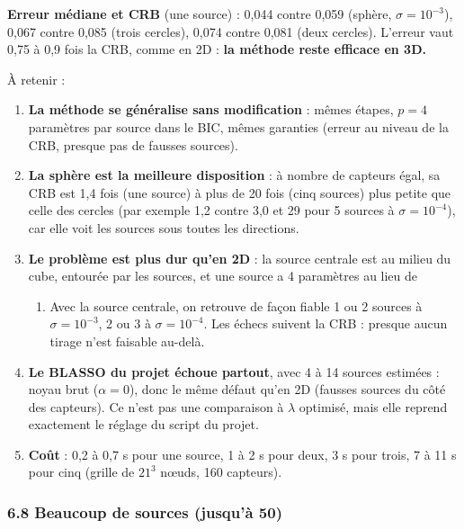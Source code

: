 \documentclass[
  french,
]{article}
\providecommand{\tightlist}{%
  \setlength{\itemsep}{0pt}\setlength{\parskip}{0pt}}
\begin{document}
\textbf{Erreur médiane et CRB} (une source) : 0,044 contre 0,059
(sphère, \(\sigma = 10^{-3}\)), 0,067 contre 0,085 (trois cercles),
0,074 contre 0,081 (deux cercles). L'erreur vaut 0,75 à 0,9 fois la CRB,
comme en 2D : \textbf{la méthode reste efficace en 3D.}

À retenir :

\begin{enumerate}
\def\labelenumi{\arabic{enumi}.}
\tightlist
\item
  \textbf{La méthode se généralise sans modification} : mêmes étapes,
  \(p = 4\) paramètres par source dans le BIC, mêmes garanties (erreur
  au niveau de la CRB, presque pas de fausses sources).
\item
  \textbf{La sphère est la meilleure disposition} : à nombre de capteurs
  égal, sa CRB est 1,4 fois (une source) à plus de 20 fois (cinq
  sources) plus petite que celle des cercles (par exemple 1,2 contre 3,0
  et 29 pour 5 sources à \(\sigma = 10^{-4}\)), car elle voit les
  sources sous toutes les directions.
\item
  \textbf{Le problème est plus dur qu'en 2D} : la source centrale est au
  milieu du cube, entourée par les sources, et une source a 4 paramètres
  au lieu de

  \begin{enumerate}
  \def\labelenumii{\arabic{enumii}.}
  \setcounter{enumii}{2}
  \tightlist
  \item
    Avec la source centrale, on retrouve de façon fiable 1 ou 2 sources
    à \(\sigma = 10^{-3}\), 2 ou 3 à \(\sigma = 10^{-4}\). Les échecs
    suivent la CRB : presque aucun tirage n'est faisable au-delà.
  \end{enumerate}
\item
  \textbf{Le BLASSO du projet échoue partout}, avec 4 à 14 sources
  estimées : noyau brut (\(\alpha = 0\)), donc le même défaut qu'en 2D
  (fausses sources du côté des capteurs). Ce n'est pas une comparaison à
  \(\lambda\) optimisé, mais elle reprend exactement le réglage du
  script du projet.
\item
  \textbf{Coût} : 0,2 à 0,7 s pour une source, 1 à 2 s pour deux, 3 s
  pour trois, 7 à 11 s pour cinq (grille de \(21^3\) nœuds, 160
  capteurs).
\end{enumerate}

\subsubsection{6.8 Beaucoup de sources (jusqu'à
50)}\label{beaucoup-de-sources-jusquuxe0-50}
\end{document}
